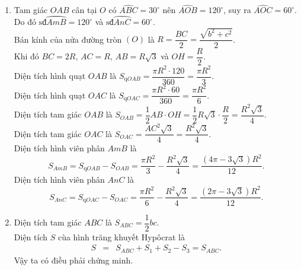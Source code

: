 \begin{bt}
{\begin{enumerate}
			Ta có nhận xét $S_3=S_1+S_2$.
			\item Tam giác $OAB$ cân tại $O$ có $\widehat{ABC}=30^\circ$ nên $\widehat{AOB}=120^\circ$, suy ra $\widehat{AOC}=60^\circ$.\\
			Do đó $\text{sđ}\wideparen{AmB}=120^\circ$ và $\text{sđ}\wideparen{AnC}=60^\circ$.\\
			Bán kính của nửa đường tròn $(O)$ là $R = \dfrac{BC}{2} = \dfrac{\sqrt{b^2+c^2}}{2}$.\\
			Khi đó $BC=2R$, $AC=R$, $AB = R\sqrt{3}$ và $OH=\dfrac{R}{2}$.\\
			Diện tích hình quạt $OAB$ là $S_{\text{q}OAB} = \dfrac{\pi R^2 \cdot 120}{360} = \dfrac{\pi R^2}{3}$.\\
			Diện tích hình quạt $OAC$ là $S_{\text{q}OAC} = \dfrac{\pi R^2 \cdot 60}{360} = \dfrac{\pi R^2}{6}$.\\
			Diện tích tam giác $OAB$ là $S_{OAB} = \dfrac{1}{2}AB \cdot OH = \dfrac{1}{2}R\sqrt{3} \cdot \dfrac{R}{2} = \dfrac{R^2\sqrt{3}}{4}$.\\
			Diện tích tam giác $OAC$ là $S_{OAC} = \dfrac{AC^2\sqrt{3}}{4} = \dfrac{R^2\sqrt{3}}{4}$.\\
			Diện tích hình viên phân $AmB$ là $$S_{AmB} = S_{\text{q}OAB} - S_{OAB} = \dfrac{\pi R^2}{3} - \dfrac{R^2\sqrt{3}}{4} = \dfrac{(4\pi - 3\sqrt{3})R^2}{12}.$$
			Diện tích hình viên phân $AnC$ là $$S_{AnC} = S_{\text{q}OAC} - S_{OAC} = \dfrac{\pi R^2}{6} - \dfrac{R^2\sqrt{3}}{4} = \dfrac{(2\pi - 3\sqrt{3})R^2}{12}.$$
			\item Diện tích tam giác $ABC$ là $S_{ABC} = \dfrac{1}{2}bc$.\\
			Diện tích $S$ cùa hình trăng khuyết Hypôcrat là
			\begin{eqnarray*}
				S &=& S_{ABC} + S_1 + S_2 - S_3 = S_{ABC}.
			\end{eqnarray*}
			Vậy ta có điều phải chứng minh.
		\end{enumerate}
	}
\end{bt}
